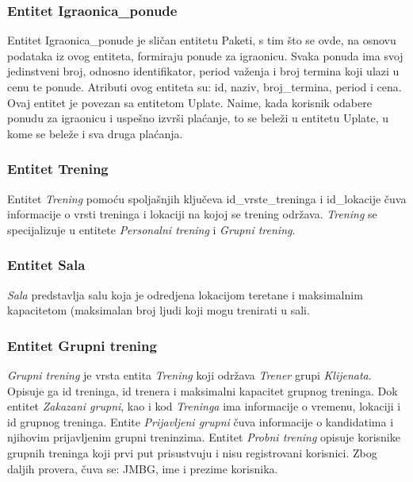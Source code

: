 \documentclass[../main.tex]{subfiles}
\begin{document}
\subsubsection{Entitet Igraonica\_ponude}
Entitet Igraonica\_ponude je sličan entitetu Paketi, s tim što se ovde, na osnovu podataka iz ovog entiteta, formiraju ponude za igraonicu. Svaka ponuda ima svoj jedinstveni broj, odnosno identifikator, period važenja i broj termina koji ulazi u cenu te ponude. Atributi ovog entiteta su: id, naziv, broj\_termina, period i cena. Ovaj entitet je povezan sa entitetom Uplate. Naime, kada korisnik odabere ponudu za igraonicu i uspešno izvrši plaćanje, to se beleži u entitetu Uplate, u kome se beleže i sva druga plaćanja.





\subsubsection{Entitet Trening}

Entitet \textit{Trening} pomoću spoljašnjih ključeva id\_vrste\_treninga i id\_lokacije čuva informacije o vrsti treninga i lokaciji na kojoj se trening održava. \textit{Trening} se specijalizuje u entitete \textit{Personalni trening} i \textit{Grupni trening}.


\subsubsection{Entitet Sala}

\textit{Sala} predstavlja salu koja je odredjena lokacijom teretane i maksimalnim kapacitetom (maksimalan broj ljudi koji mogu trenirati u sali.


\subsubsection{Entitet Grupni trening}

\textit{Grupni trening} je vrsta entita \textit{Trening} koji održava \textit{Trener} grupi \textit{Klijenata}. Opisuje ga id treninga, id trenera i maksimalni kapacitet grupnog treninga. Dok entitet \textit{Zakazani grupni}, kao i kod \textit{Treninga} ima informacije o vremenu, lokaciji i id grupnog treninga.
Entite \textit{Prijavljeni grupni} čuva informacije o kandidatima i njihovim prijavljenim grupni treninzima.
Entitet \textit{Probni trening} opisuje korisnike grupnih treninga koji prvi put prisustvuju i nisu registrovani korisnici. Zbog daljih provera, čuva se: JMBG, ime i prezime korisnika.
\end{document}
